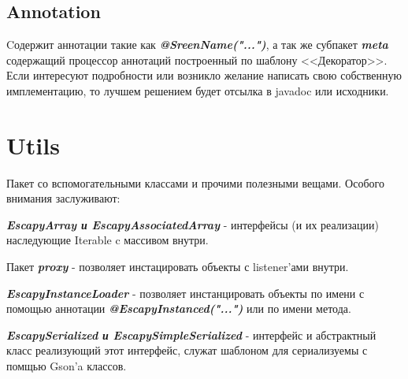 \documentclass[11pt]{report}
\newenvironment{itemize*}%
  {\begin{itemize}%
    \setlength{\itemsep}{2pt}%
    \setlength{\parskip}{0.75pt}}%
  {\end{itemize}}
\begin{document}
\section{Annotation}
Cодержит аннотации такие как \textit{\textbf{@SreenName("...")}}, а так же субпакет 
\textit{\textbf{meta}} содержащий процессор аннотаций построенный по шаблону <<Декоратор>>. Если интересуют подробности или возникло желание написать свою собственную имплементацию, то лучшем решением будет отсылка в javadoc или исходники.



\chapter{Utils}
Пакет со вспомогательными классами и прочими полезными вещами. Особого внимания заслуживают: \begin{itemize*}
	
	\item \textit{\textbf{EscapyArray и EscapyAssociatedArray}} - интерфейсы (и их 				реализации) наследующие Iterable c массивом внутри.
	
	\item Пакет \textit{\textbf{proxy}} - позволяет инстацировать объекты с listener'ами 		внутри.
	
	\item \textit{\textbf{EscapyInstanceLoader}}  - позволяет инстанцировать объекты по 		имени с помощью аннотации \textit{\textbf{@EscapyInstanced("...")}} или по имени 			метода.

	\item \textit{\textbf{EscapySerialized и EscapySimpleSerialized}} - интерфейс и 			абстрактный класс реализующий этот интерфейс, служат шаблоном для сериализуемы с помщью
	Gson'a классов.

\end{itemize*}
	
	
	
\end{document}
